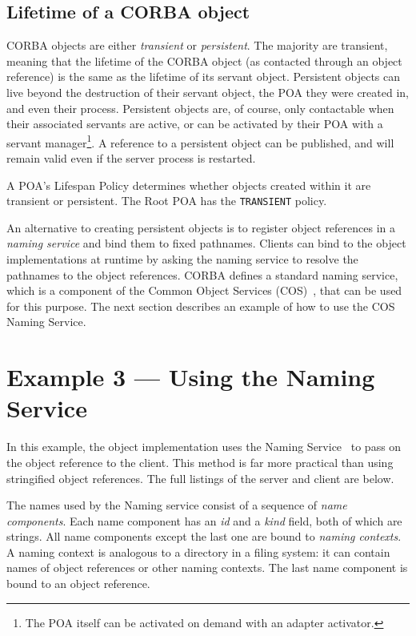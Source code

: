 \documentclass[11pt,twoside,a4paper]{book}
\newcommand{\code}[1]{\texttt{#1}}
\newcommand{\term}[1]{\textit{#1}}
\begin{document}
\subsection{Lifetime of a CORBA object}

CORBA objects are either \term{transient} or \term{persistent}. The
majority are transient, meaning that the lifetime of the CORBA object
(as contacted through an object reference) is the same as the lifetime
of its servant object. Persistent objects can live beyond the
destruction of their servant object, the POA they were created in, and
even their process. Persistent objects are, of course, only
contactable when their associated servants are active, or can be
activated by their POA with a servant manager\footnote{The POA itself
can be activated on demand with an adapter activator.}. A reference to
a persistent object can be published, and will remain valid even if
the server process is restarted.

A POA's Lifespan Policy determines whether objects created within it
are transient or persistent. The Root POA has the \code{TRANSIENT}
policy.

An alternative to creating persistent objects is to register object
references in a \term{naming service} and bind them to fixed
pathnames. Clients can bind to the object implementations at runtime
by asking the naming service to resolve the pathnames to the object
references. CORBA defines a standard naming service, which is a
component of the Common Object Services (COS)~\cite{corbaservices},
that can be used for this purpose. The next section describes an
example of how to use the COS Naming Service.



\section{Example 3 --- Using the Naming Service}
\label{sec:usingNS}

In this example, the object implementation uses the Naming
Service~\cite{corbaservices} to pass on the object reference to the
client.  This method is far more practical than using stringified
object references. The full listings of the server and client are
below.

The names used by the Naming service consist of a sequence of
\term{name components}. Each name component has an \term{id} and a
\term{kind} field, both of which are strings. All name components
except the last one are bound to \term{naming contexts}. A naming
context is analogous to a directory in a filing system: it can contain
names of object references or other naming contexts. The last name
component is bound to an object reference.
\end{document}

